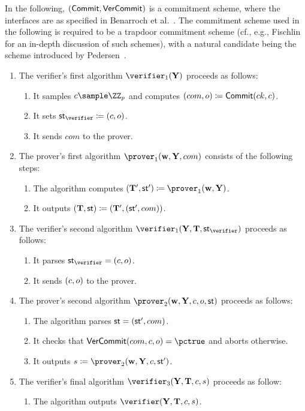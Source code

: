 \documentclass[runningheads,11pt]{article}
\begin{document}
In the following, $({\sf Commit}, {\sf VerCommit})$ is a commitment scheme, where the interfaces are as specified in Benarroch et al.~\cite[Section 4.3]{becafi19}.
The commitment scheme used in the following is required to be a trapdoor commitment scheme (cf., e.g., Fischlin~\cite{fischlin01} for an in-depth discussion of such schemes), with a natural candidate being the scheme introduced by Pedersen~\cite{C:Pedersen91}.
\begin{enumerate}
  \item
    The verifier's first algorithm $\verifier_1(\vec \statement)$ proceeds as follows:
    \begin{enumerate}
      \item
	It samples $\challenge\sample\ZZ_p$ and computes $(com,o)\coloneqq{\sf Commit}(ck,c)$.
      \item
        It sets $\st_\verifier\defeq(\challenge,o)$.
      \item
        It sends $com$ to the prover.
    \end{enumerate}
  \item
    The prover's first algorithm $\prover_1(\vec \witness,\vec \statement,com)$ consists of the following steps:
    \begin{enumerate}
      \item
	The algorithm computes $(\vec \commitment',\st') \defeq \prover_1(\vec \witness,\vec \statement)$.
      \item
	It outputs $(\mathbf {T},\mathsf{st}) \coloneqq (\mathbf {T}',(\mathsf{st}',com))$.
    \end{enumerate}
  \item
    The verifier's second algorithm $\verifier_1(\vec \statement,\vec \commitment,\st_\verifier)$ proceeds as follows:
    \begin{enumerate}
      \item
        It parses $\st_\verifier=(\challenge,o)$.
      \item
        It sends $(c,o)$ to the prover.
    \end{enumerate}
  \item
    The prover's second algorithm $\prover_2(\vec \witness,\vec \statement,\challenge,o,\st)$ proceeds as follows:
    \begin{enumerate}
      \item
        The algorithm parses $\mathsf{st}=(\mathsf{st}',com)$.
      \item
        It checks that ${\sf VerCommit}(com,\challenge,o)=\accept$ and aborts otherwise.
      \item
        It outputs $s\defeq\prover_2(\vec \witness, \vec \statement,\challenge,\st')$.
    \end{enumerate}
  \item
    The verifier's final algorithm $\verifier_3(\vec \statement,\vec \commitment,\challenge,\response)$ proceeds as follow:
    \begin{enumerate}
      \item
	The algorithm outputs $\verifier(\vec \statement,\vec \commitment,\challenge,\response)$.
    \end{enumerate}
\end{enumerate}
\end{document}
